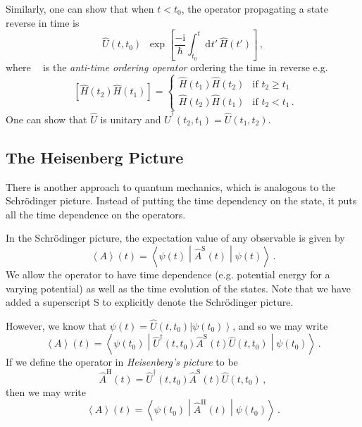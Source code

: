 \documentclass{article}
\theoremstyle{plain}\theoremheaderfont{\normalfont\itshape}\theorembodyfont{\rmfamily}\theoremseparator{.}\newtheorem*{rem}{Remark}\newtheorem*{ex}{Example}\newtheorem*{proof}{Proof}\newtheorem*{altp}{Alternative proof}
\theoremstyle{plain}\theoremheaderfont{\normalfont\bfseries}\theorembodyfont{\rmfamily}\theoremseparator{.}\newtheorem{thm}{Theorem}[section]\newtheorem{lem}[thm]{Lemma}\newtheorem{prop}[thm]{Proposition}\newtheorem*{cor}{Corollary}\newtheorem{defn}[thm]{Definition}\newtheorem{clm}[thm]{Claim}\newtheorem{clminproof}{Claim}
\theoremstyle{break}\theoremheaderfont{\normalfont\itshape}\theorembodyfont{\rmfamily}\theoremseparator{.\medskip}\newtheorem*{proofskip}{Proof}\newtheorem*{exs}{Examples}\newtheorem*{rems}{Remarks}
\theoremstyle{break}\theoremheaderfont{\normalfont\bfseries}\theorembodyfont{\rmfamily}\theoremseparator{.\medskip}\newtheorem{lemskip}[thm]{Lemma}\newtheorem{defnskip}[thm]{Definition}\newtheorem{propskip}[thm]{Proposition}\newtheorem{thmskip}[thm]{Theorem}
\numberwithin{equation}{section}
\newcommand{\ii}{\mathrm{i}}
\newcommand{\dd}[2][]{\mathrm{d}^{#1} #2\,}
\newcommand{\ket}[1]{\left| #1 \right\rangle}
\newcommand{\eval}[1]{\left\langle #1 \right\rangle}
\newcommand{\expval}[2]{\left\langle #2 \middle| #1 \middle| #2 \right\rangle}
\DeclareMathOperator{\trev}{\overrightarrow{\mathcal{T}}}
\newcommand{\Sch}{^{\mathrm{S}}}
\newcommand{\Hei}{^{\mathrm{H}}}
\begin{document}
    Similarly, one can show that when \(t<t_0\), the operator propagating a state reverse in time is
    \begin{equation}
        \hat{U}(t,t_0)\trev\exp\left[\frac{-\ii}{\hbar}\int_{t_0}^{t}\dd{t'}\hat{H}(t')\right]\,,
    \end{equation}
    where \(\trev\) is the \textit{anti-time ordering operator} ordering the time in reverse e.g.
    \begin{equation}
        \trev\left[\hat{H}(t_2)\hat{H}(t_1)\right]=\begin{cases}
            \hat{H}(t_1)\hat{H}(t_2) & \text{if }t_2\ge t_1\\
            \hat{H}(t_2)\hat{H}(t_1) & \text{if }t_2<t_1\,.
        \end{cases}
    \end{equation}
    One can show that \(\hat{U}\) is unitary and \(\hat{U}^\dagger(t_2,t_1)=\hat{U}(t_1,t_2)\).

    \subsection{The Heisenberg Picture}
    There is another approach to quantum mechanics, which is analogous to the Schr\"{o}dinger picture. Instead of putting the time dependency on the state, it puts all the time dependence on the operators.
    
    In the Schr\"{o}dinger picture, the expectation value of any observable is given by
    \begin{equation}
        \eval{A}(t)=\expval{\hat{A}\Sch (t)}{\psi(t)}\,.
    \end{equation}
    We allow the operator to have time dependence (e.g. potential energy for a varying potential) as well as the time evolution of the states. Note that we have added a superscript S to explicitly denote the Schr\"{o}dinger picture.

    However, we know that \(\psi(t)=\hat{U}(t,t_0)\ket{\psi(t_0)}\), and so we may write
    \begin{equation}
        \eval{A}(t)=\expval{\hat{U}^\dagger(t,t_0)\hat{A}\Sch(t)\hat{U}(t,t_0)}{\psi(t_0)}\,.
    \end{equation}
    If we define the operator in \textit{Heisenberg's picture} to be
    \begin{equation}
        \hat{A}\Hei(t)=\hat{U}^\dagger(t,t_0)\hat{A}\Sch(t)\hat{U}(t,t_0)\,,
    \end{equation}
    then we may write
    \begin{equation}
        \eval{A}(t)=\expval{\hat{A}\Hei(t)}{\psi(t_0)}\,.
    \end{equation}
\end{document}

